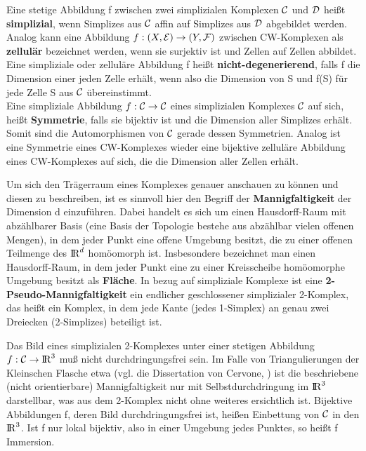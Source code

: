 Eine stetige Abbildung f zwischen zwei simplizialen Komplexen $\cal C$
und ${\cal D}$ heißt {\bf simplizial}, wenn
Simplizes aus $\cal C$ affin auf Simplizes aus ${\cal D}$ abgebildet werden.
Analog kann eine Abbildung $f:(X,{\cal E})\to (Y,{\cal F})$
zwischen CW-Komplexen als {\bf zellulär} bezeichnet
werden, wenn sie surjektiv ist und Zellen auf Zellen abbildet.\\
Eine simpliziale oder zelluläre Abbildung f heißt {\bf nicht-degenerierend},
 falls f die Dimension einer jeden Zelle erhält,
wenn also die Dimension von S und f(S) für jede Zelle S aus $\cal C$
übereinstimmt.\\
Eine simpliziale Abbildung $f:{\cal C} \to {\cal C}$ eines simplizialen
Komplexes $\cal C$ auf sich, heißt {\bf Symmetrie},\label{symm} falls sie bijektiv ist und die Dimension aller Simplizes
erhält. Somit sind die Automorphismen von $\cal C$ gerade dessen Symmetrien.
Analog ist eine Symmetrie eines CW-Komplexes wieder eine bijektive zelluläre
Abbildung eines CW-Komplexes auf sich, die die Dimension aller Zellen erhält.

Um sich den Trägerraum eines Komplexes genauer anschauen zu können und
diesen zu beschreiben, ist es sinnvoll hier den Begriff der
{\bf Mannigfaltigkeit} der Dimension d einzuführen.
Dabei handelt es sich um einen Hausdorff-Raum mit abzählbarer Basis
(eine Basis der Topologie bestehe aus abzählbar vielen offenen Mengen),
in dem jeder Punkt eine offene Umgebung besitzt, die zu einer offenen Teilmenge
des $\mbox{$\rm I\!R$}^d$ homöomorph ist. Insbesondere bezeichnet man einen Hausdorff-Raum,
in dem jeder Punkt eine zu einer Kreisscheibe homöomorphe Umgebung besitzt
als {\bf Fläche}. In bezug auf simpliziale Komplexe ist eine
{\bf 2-Pseudo-Mannigfaltigkeit} ein endlicher
geschlossener simplizialer 2-Komplex, das heißt ein Komplex, in dem jede Kante
(jedes 1-Simplex) an genau zwei Dreiecken (2-Simplizes) beteiligt ist.

{\scsi
Das Bild eines simplizialen 2-Komplexes unter einer stetigen Abbildung
$f:{\cal C}\to \mbox{$\rm I\!R$}^3$ muß nicht durchdringungsfrei sein. Im Falle von
Triangulierungen der Kleinschen Flasche etwa (vgl. die Dissertation von Cervone,
\cite{Ce:93}) ist die beschriebene (nicht orientierbare) Mannigfaltigkeit nur
mit Selbstdurchdringung im $\mbox{$\rm I\!R$}^3$ darstellbar, was aus dem 2-Komplex
nicht ohne weiteres ersichtlich ist. Bijektive Abbildungen f, deren Bild
durchdringungsfrei ist, heißen Einbettung von $\cal C$ in den $\mbox{$\rm I\!R$}^3$.
Ist f nur lokal bijektiv, also in einer Umgebung jedes Punktes, so heißt f
Immersion.
}


